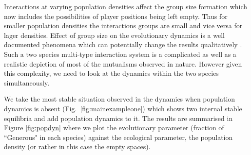 \documentclass[12pt]{article}
\begin{document}
Interactions at varying population densities affect the group size formation which now includes the possibilities of player positions being left empty.
Thus for smaller population densities the interactions groups are small and vice versa for lager densities.
Effect of group size on the evolutionary dynamics is a well documented phenomena which can potentially change the results qualitatively \citep{pacheco:PRSB:2009,souza:JTB:2009}.
Such a two species multi-type interaction system is a complicated as well as a realistic depiction of most of the mutualisms observed in nature.
However given this complexity, we need to look at the dynamics within the two species simultaneously.

We take the most stable situation observed in the dynamics when population dynamics is absent (Fig.~\ref{fig:mainexampleone}) which shows two internal stable equilibria and add population dynamics to it.
The results are summarised in Figure \ref{fig:popdyn} where we plot the evolutionary parameter (fraction of ``Generous" in each species) against the ecological parameter, the population density (or rather in this case the empty spaces).
\end{document}
